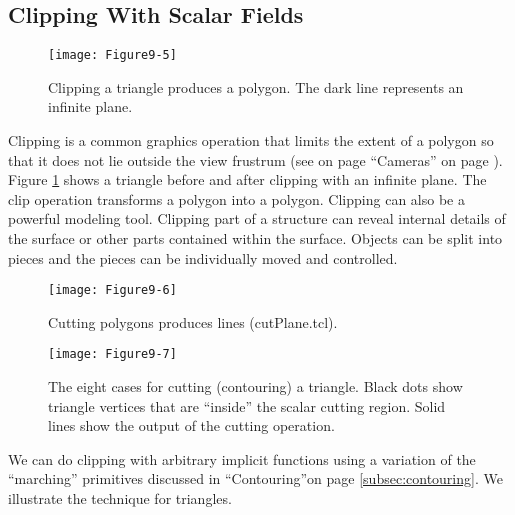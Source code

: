 \subsection{Clipping With Scalar Fields}

\begin{figure}[!htb]
    \centering
    \texttt{[image: Figure9-5]}\\
    \caption{Clipping a triangle produces a polygon. The dark line represents an infinite plane.}\label{fig:Figure9-5}
\end{figure}


Clipping is a common graphics operation that limits the extent of a polygon so that it does not lie outside the view frustrum (see on page ``Cameras'' on page \pageref{sec:cameras}). Figure \ref{fig:Figure9-5} shows a triangle before and after clipping with an infinite plane. The clip operation transforms a polygon into a polygon. Clipping can also be a powerful modeling tool. Clipping part of a structure can reveal internal details of the surface or other parts contained within the surface. Objects can be split into pieces and the pieces can be individually moved and controlled.

\begin{figure}[!htb]
    \centering
    \texttt{[image: Figure9-6]}\\
    \caption{Cutting polygons produces lines (cutPlane.tcl).}\label{fig:Figure9-6}
\end{figure}

\begin{figure}[!htb]
    \centering
    \texttt{[image: Figure9-7]}\\
    \caption{The eight cases for cutting (contouring) a triangle. Black dots show triangle vertices that are ``inside'' the scalar cutting region. Solid lines show the output of the cutting operation.}\label{fig:Figure9-7}
\end{figure}

We can do clipping with arbitrary implicit functions using a variation of the ``marching'' primitives discussed in ``Contouring''on page \ref{subsec:contouring}. We illustrate the technique for triangles.

